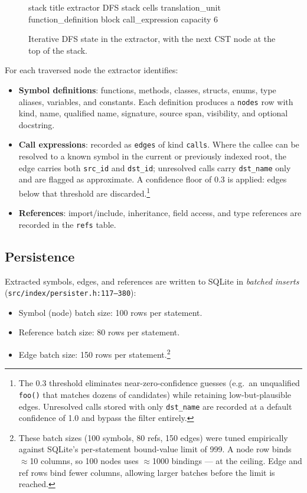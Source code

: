 \begin{figure}[htbp]
  \centering
\begin{triton}
stack
  title extractor DFS stack
  cells translation_unit function_definition block call_expression
  capacity 6
\end{triton}
  \caption{Iterative DFS state in the extractor, with the next CST node at the
           top of the stack.}
  \label{fig:extractor-stack}
\end{figure}

For each traversed node the extractor identifies:
\begin{itemize}
  \item \textbf{Symbol definitions}: functions, methods, classes, structs,
        enums, type aliases, variables, and constants. Each definition
        produces a \texttt{nodes} row with kind, name, qualified name,
        signature, source span, visibility, and optional docstring.
  \item \textbf{Call expressions}: recorded as \texttt{edges} of kind
        \texttt{calls}. Where the callee can be resolved to a known symbol
        in the current or previously indexed root, the edge carries both
        \texttt{src\_id} and \texttt{dst\_id}; unresolved calls carry
        \texttt{dst\_name} only and are flagged as approximate. A confidence
        floor of 0.3 is applied: edges below that threshold are
        discarded.\footnote{The 0.3 threshold eliminates near-zero-confidence
        guesses (e.g.\ an unqualified \texttt{foo()} that matches dozens of
        candidates) while retaining low-but-plausible edges. Unresolved calls
        stored with only \texttt{dst\_name} are recorded at a default confidence
        of 1.0 and bypass the filter entirely.}
  \item \textbf{References}: import/include, inheritance, field access, and
        type references are recorded in the \texttt{refs} table.
\end{itemize}

\subsection{Persistence}
\label{sec:persistence}

Extracted symbols, edges, and references are written to SQLite in
\emph{batched inserts} (\texttt{src/index/persister.h:117--380}):
\begin{itemize}
  \item Symbol (node) batch size: 100 rows per statement.
  \item Reference batch size: 80 rows per statement.
  \item Edge batch size: 150 rows per statement.\footnote{These batch
        sizes (100 symbols, 80 refs, 150 edges) were tuned empirically against
        SQLite's per-statement bound-value limit of 999. A node row binds
        $\approx$10 columns, so 100 nodes uses $\approx$1000 bindings --- at
        the ceiling. Edge and ref rows bind fewer columns, allowing larger
        batches before the limit is reached.}
\end{itemize}

